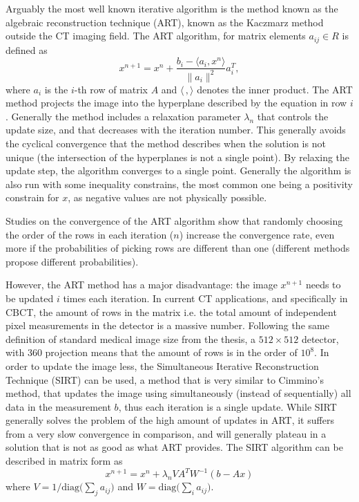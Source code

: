 Arguably the most well known iterative algorithm is the method known as the algebraic reconstruction technique (ART)\cite{K-1937}, known as the Kaczmarz method outside the CT imaging field. The ART algorithm, for matrix elements $a_{ij}\in R$ is defined as
\begin{equation}
x^{n+1}=x^n+\frac{b_i-\langle a_i,x^n\rangle}{\lVert{a_i}\rVert^2}a_i^T,
\end{equation}
where $a_i$ is the $i$-th row of matrix $A$ and $\langle \,, \rangle$ denotes the inner product. The ART method projects the image into the hyperplane described by the equation in row $i$. Generally the method includes a relaxation parameter $\lambda_n$ that controls the update size, and that decreases with the iteration number. This generally avoids the cyclical convergence that the method describes when the solution is not unique (the intersection of the hyperplanes is not a single point). By relaxing the update step, the algorithm converges to a single point. Generally the algorithm is also run with some inequality constrains, the most common one being a positivity constrain for $x$, as negative values are not physically possible.

Studies on the convergence of the ART algorithm show\cite{241889} that randomly choosing the order of the rows in each iteration ($n$) increase the convergence rate, even more if the probabilities of picking rows are different than one (different methods propose different probabilities)\cite{strohmer2009randomized}\cite{liu2016accelerated}. 

However, the ART method has a major disadvantage: the image $x^{n+1}$ needs to be updated $i$ times each iteration. In current CT applications, and specifically in CBCT, the amount of rows in the matrix i.e. the total amount of independent pixel measurements in the detector is a massive number. Following the same definition of standard medical image size from the thesis, a $512\times512$ detector, with 360 projection means that the amount of rows is in the order of $10^8$. In order to update the image less, the Simultaneous Iterative Reconstruction Technique (SIRT)\cite{SIRT} can be used, a method that is very similar to Cimmino's method, that updates the image using simultaneously (instead of sequentially) all data in the measurement $b$, thus each iteration is a single update. While SIRT generally solves the problem of the high amount of updates in ART, it suffers from a very slow convergence in comparison, and will generally plateau in a solution that is not as good as what ART provides. The SIRT algorithm can be described in matrix form as
\begin{equation}
x^{n+1}=x^n+\lambda_n V A^T W^{-1}\left(b-Ax\right) \label{eq:SIRT}
\end{equation}
where $V=1/\text{diag}\bigl({\sum_j a_{ij}}\bigr)$ and  $W=\text{diag}\bigl({\sum_i a_{ij}}\bigr)$.

